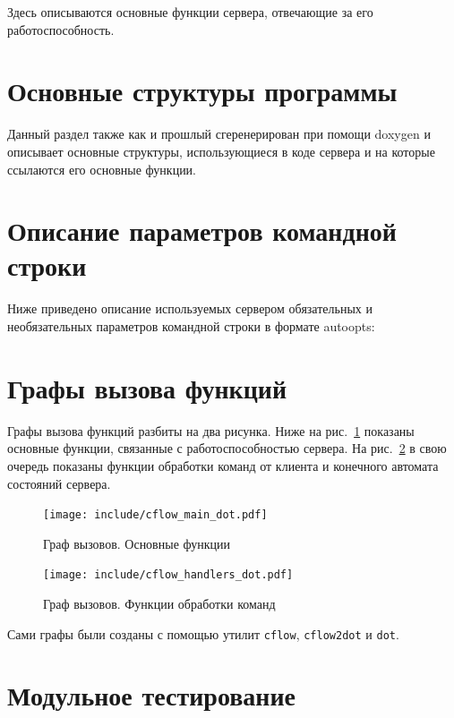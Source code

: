 \documentclass[a4paper,12pt]{report}
\begin{document}
Здесь описываются основные функции сервера, отвечающие за его работоспособность.





\section{Основные структуры программы}

Данный раздел также как и прошлый сгеренерирован при помощи doxygen и описывает основные структуры, использующиеся в коде сервера и на которые ссылаются его основные функции.







\section{Описание параметров командной строки}

Ниже приведено описание используемых сервером обязательных и необязательных параметров командной строки в формате autoopts:



\section{Графы вызова функций}

Графы вызова функций разбиты на два рисунка. Ниже на рис.~\ref{fig:cflow1} показаны основные функции, связанные с работоспособностью сервера. На рис.~\ref{fig:cflow2} в свою очередь показаны функции обработки команд от клиента и конечного автомата состояний сервера.

\begin{figure}[h]
\texttt{[image: include/cflow\_main\_dot.pdf]}
\caption{Граф вызовов. Основные функции}
\label{fig:cflow1}
\end{figure}

\begin{figure}
\centering
\texttt{[image: include/cflow\_handlers\_dot.pdf]}
\caption{Граф вызовов. Функции обработки команд}
\label{fig:cflow2}
\end{figure}

Сами графы были созданы с помощью утилит \texttt{cflow}, \texttt{cflow2dot} и \texttt{dot}.


\section{Модульное тестирование}
\end{document}
